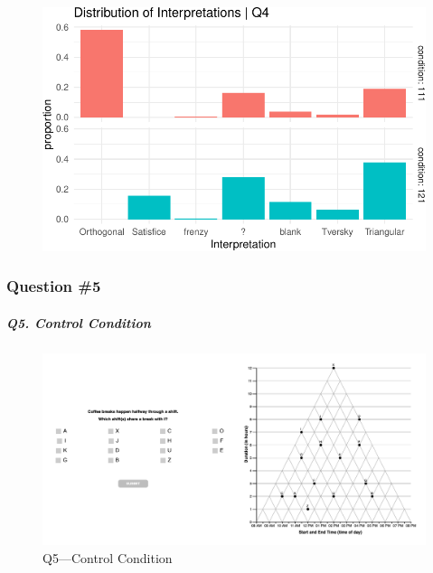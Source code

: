\documentclass[
  letterpaper,
  DIV=11,
  numbers=noendperiod]{scrreprt}
\let\oldsubparagraph\subparagraph
\renewcommand{\subparagraph}[1]{\oldsubparagraph{#1}\mbox{}}
\begin{document}
\begin{figure}[H]

{\centering \includegraphics{analysis/SGC3A/2_sgc3A_scoring_files/figure-pdf/Q4-distribution-2.pdf}

}

\end{figure}

\hypertarget{question-5}{%
\subsubsection{Question \#5}\label{question-5}}

\hypertarget{q5.-control-condition}{%
\subparagraph{Q5. Control Condition}\label{q5.-control-condition}}

\begin{figure}

{\centering \includegraphics{analysis/SGC3A/static/questions/Q5_111.png}

}

\caption{\label{fig-Q5-111}Q5---Control Condition}

\end{figure}
\end{document}
